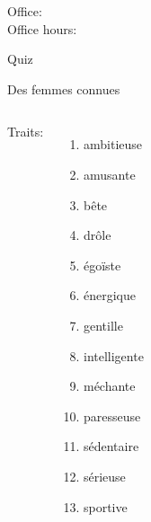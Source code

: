 \documentclass{beamer}
\subtitle[Caractère et questions]{Les traits de caractère et les questions}
\begin{document}
  \begin{frame}
    \titlepage
    \tiny{Office: \\
          Office hours: }
  \end{frame}

  \begin{frame}{}
    \begin{center}
      \Large Quiz
    \end{center}
  \end{frame}

  \begin{frame}{Des femmes connues}
    \begin{columns}
        \scriptsize
        Traits:
        \begin{enumerate}
          \item ambitieuse
          \item amusante
          \item bête
          \item drôle
          \item égoïste
          \item énergique
          \item gentille
          \item intelligente
          \item méchante
          \item paresseuse
          \item sédentaire
          \item sérieuse
          \item sportive
        \end{enumerate}
        \begin{minipage}[c][0.6\textheight]{\linewidth}
          \begin{center}
          \end{center}
        \end{minipage}
    \end{columns}
  \end{frame}
\end{document}

